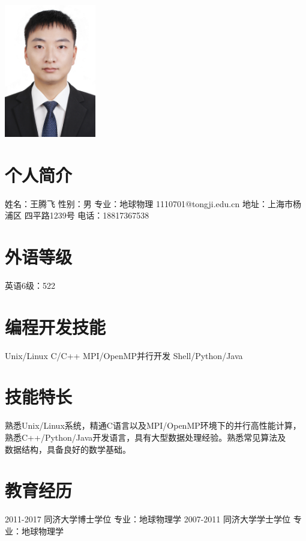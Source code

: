 \documentclass[]{friggeri-cv}
\begin{document}
       {}
\begin{aside}
\includegraphics[width=4cm]{IMG_4827small.jpg}
  \section{个人简介}
   姓名：王腾飞 
   性别：男
   专业：地球物理
   1110701@tongji.edu.cn
   地址：上海市杨浦区
   四平路1239号
   电话：18817367538
  \section{外语等级}
  英语6级：522
  \section{编程开发技能}
	Unix/Linux
    C/C++
	MPI/OpenMP并行开发
    Shell/Python/Java
\end{aside}

\section{技能特长}
\large
熟悉Unix/Linux系统，精通C语言以及MPI/OpenMP环境下的并行高性能计算，\\
熟悉C++/Python/Java开发语言，具有大型数据处理经验。熟悉常见算法及\\
数据结构，具备良好的数学基础。\\

\section{教育经历}
\begin{entrylist}
  \entryTwo
    {2011-2017}
    {同济大学博士学位 \quad 专业：地球物理学}
  \entryTwo
    {2007-2011}
    {同济大学学士学位 \quad 专业：地球物理学}
\end{entrylist}
\end{document}
